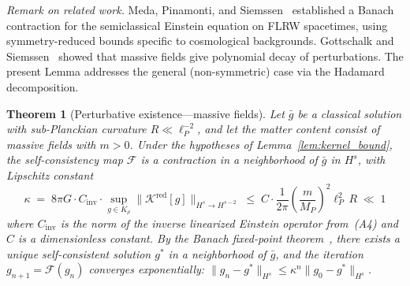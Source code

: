 \documentclass[12pt,a4paper]{article}
\newtheorem{theorem}{Theorem}
\begin{document}
\smallskip\noindent\textit{Remark on related work.} Meda, Pinamonti, and
Siemssen~\cite{meda_pinamonti_siemssen} established a Banach contraction for the
semiclassical Einstein equation on FLRW spacetimes, using symmetry-reduced bounds
specific to cosmological backgrounds. Gottschalk and Siemssen~\cite{gottschalk_siemssen}
showed that massive fields give polynomial decay of perturbations. The present Lemma
addresses the general (non-symmetric) case via the Hadamard decomposition.

\medskip

\begin{theorem}[Perturbative existence---massive fields]
\label{thm:banach}
Let $\bar{g}$ be a classical solution with sub-Planckian curvature
$R \ll \ell_P^{-2}$, and let the matter content consist of massive fields with
$m > 0$. Under the hypotheses of Lemma~\ref{lem:kernel_bound}, the self-consistency
map $\mathcal{F}$ is a contraction in a neighborhood of $\bar{g}$ in $H^s$, with
Lipschitz constant
\begin{equation}
\kappa \;=\; 8\pi G \cdot C_{\mathrm{inv}} \cdot
\sup_{g \in K_\rho}\bigl\|\mathcal{K}^{\mathrm{red}}[g]\bigr\|_{H^s \to H^{s-2}}
\;\leq\; C \cdot \frac{1}{2\pi}\!\left(\frac{m}{M_P}\right)^{\!2}\ell_P^2\, R
\;\ll\; 1
\label{eq:kappa}
\end{equation}
where $C_{\mathrm{inv}}$ is the norm of the inverse linearized Einstein operator
from~\emph{(A4)} and $C$ is a dimensionless constant. By the Banach fixed-point
theorem~\cite{banach}, there exists a unique self-consistent solution $g^*$ in a neighborhood of
$\bar{g}$, and the iteration $g_{n+1} = \mathcal{F}(g_n)$ converges exponentially:
$\|g_n - g^*\|_{H^s} \leq \kappa^n\|g_0 - g^*\|_{H^s}$.
\end{theorem}
\end{document}
